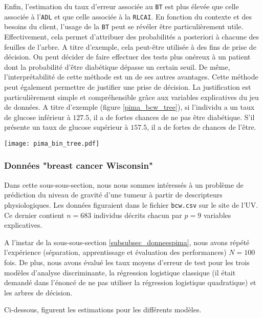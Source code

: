 \documentclass{article}
\begin{document}
\begin{multicols}{2}
Enfin, l'estimation du taux d'erreur associée au \texttt{BT} est plus élevée que celle associée à l'\texttt{ADL} et que celle associée à la \texttt{RLCAI}. En fonction du contexte et des besoins du client, l'usage de la \texttt{BT} peut se révéler être particulièrement utile. Effectivement, cela permet d'attribuer des probabilités a posteriori à chacune des feuilles de l'arbre. A titre d'exemple, cela peut-être utilisée à des fins de prise de décision. On peut décider de faire effectuer des tests plus onéreux à un patient dont la probabilité d'être diabétique dépasse un certain seuil. De même, l'interprétabilité de cette méthode est un de ses autres avantages. Cette méthode peut également permettre de justifier une prise de décision. La justification est particulièrement simple et compréhensible grâce aux variables explicatives du jeu de données. A titre d'exemple (figure \ref{pima_bcw_tree}), si l'individu a un taux de glucose inférieur à $127.5$, il a de fortes chances de ne pas être diabétique. S'il présente un taux de glucose supérieur à $157.5$, il a de fortes de chances de l'être.

\begingroup
   \centering
   \texttt{[image: pima\_bin\_tree.pdf]}
    \label{pima_bcw_tree}
\endgroup

\subsubsection{Données "breast cancer Wisconsin"}
\label{subsubsec_donneesbcw}
Dans cette sous-sous-section, nous nous sommes intéressés à un problème de prédiction du niveau de gravité d'une tumeur à partir de descripteurs physiologiques. Les données figuraient dans le fichier \texttt{bcw.csv} sur le site de l'UV. Ce dernier contient $n = 683$ individus décrits chacun par $p = 9$ variables explicatives. 

A l'instar de la sous-sous-section \ref{subsubsec_donneespima}, nous avons répété l'expérience (séparation, apprentissage et évaluation des performances) $N = 100$ fois. De plus, nous avons évalué les taux moyens d'erreur de test pour les trois modèles d'analyse discriminante, la régression logistique classique (il était demandé dans l'énoncé de ne pas utiliser la régression logistique quadratique) et les arbres de décision.

Ci-dessous, figurent les estimations pour les différents modèles. 


\end{multicols}
\end{document}
